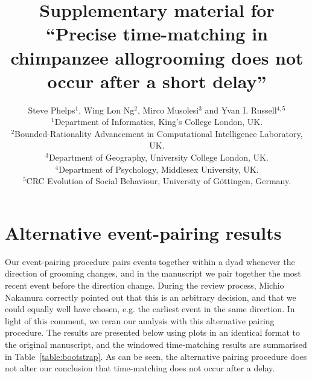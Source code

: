 \documentclass[12pt]{article}
\begin{document}
\linenumbers

\baselineskip24pt

\author{%
Steve Phelps$^{1}$, Wing Lon Ng$^{2}$, Mirco Musolesi$^{3}$ and Yvan I. Russell$^{4,5}$\\
\normalsize{$^{1}$Department of Informatics, King's College London, UK.}\\
\normalsize{$^{2}$Bounded-Rationality Advancement in Computational Intelligence Laboratory, UK.}\\
\normalsize{$^{3}$Department of Geography, University College London, UK.}\\
\normalsize{$^{4}$Department of Psychology, Middlesex University, UK.} \\
\normalsize{$^{5}$CRC Evolution of Social Behaviour, University of G\"{o}ttingen, Germany.}
}
% 
% 
% 
% 
\title{Supplementary material for ``Precise time-matching in chimpanzee allogrooming does not occur after a short delay''}

\maketitle

\section{Alternative event-pairing results}

Our event-pairing procedure pairs events together within a dyad whenever the 
direction of grooming changes, and in the manuscript we pair together the most 
recent event before the direction change.  During the review process, Michio 
Nakamura correctly pointed out that this is an arbitrary decision, and that we 
could equally well have chosen, e.g. the earliest event in the same direction.  
In light of this comment, we reran our analysis with this alternative pairing 
procedure.  The results are presented below using plots in an identical format 
to the original manuscript, and the windowed time-matching results are 
summarised in Table~\ref{table:bootstrap}.  As can be seen, the alternative 
pairing procedure does not alter our conclusion that time-matching does not 
occur after a delay.
\end{document}
